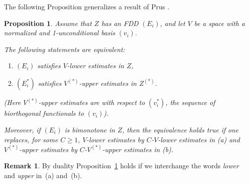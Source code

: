 \documentclass[11pt,leqno]{amsart}
\newtheorem{prop}[thm]{Proposition}
\theoremstyle{definition}
\newtheorem*{remark}{Remark}
\newcommand{\Zs}{Z^{(*)}}
\newcommand{\Vs}{V^{(*)}}
\begin{document}
The following Proposition generalizes a result of Prus \cite{P}.
\begin{prop}
  \label{P:1.3}
  Assume that $Z$ has an FDD $(E_i)$, and let $V$ be a space with
  a normalized and 1-unconditional basis $(v_i)$.
  
  The following statements are equivalent:
  \begin{enumerate}
  \item[a)] $(E_i)$ satisfies $V$-lower estimates in $Z$,
  \item[b)] $(E^*_i)$ satisfies $\Vs$-upper estimates in  $\Zs$.
  \end{enumerate}
  (Here $\Vs$-upper estimates are with respect to $(v_i^*)$, the
  sequence of biorthogonal functionals to $(v_i)$).
  
  Moreover, if $(E_i)$ is bimonotone in $Z$, then the equivalence
  holds true if one replaces, for some $C\ge 1$, $V$-lower estimates
  by $C$-$V$-lower estimates in (a) and  $\Vs$-upper estimates by
  $C$-$\Vs$-upper estimates in (b).
\end{prop}
\begin{remark} By duality Proposition~\ref{P:1.3} holds if we
  interchange the words \emph{lower} and \emph{upper} in~(a) and~(b).
\end{remark}
\end{document}

